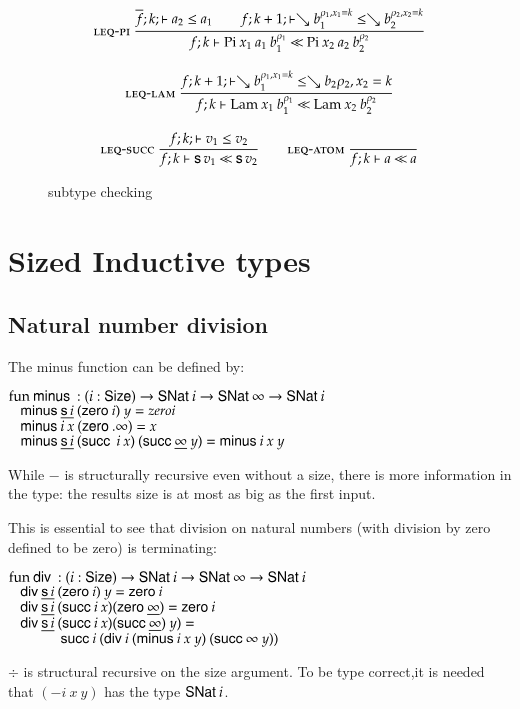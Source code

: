 \begin{figure}
\begin{gather*}
\mbox{\sc leq-pi}\ \dfrac{\overline{f};k;\vdash a_2\leq a_1
\qquad
f;k+1;\vdash\searrow b_1^{\rho_1,x_1=k}\leq\searrow b_2^{\rho_2,x_2=k}}{f;k\vdash\mathrm{Pi} \: x_1 \: a_1 \: b_1^{\rho_1}{\:\ll\:}\mathrm{Pi} \: x_2 \: a_2 \: b_2^{\rho_2}}
\\[2ex]
\mbox{\sc leq-lam}\ \dfrac{f;k+1;\vdash\searrow b_1^{\rho_1,x_1=k}\leq\searrow{b_2}{\rho_2,x_2=k}}{f;k\vdash\mathrm{Lam} \: x_1 \: b_1^{\rho_1}{\:\ll\:}\mathrm{Lam} \: x_2 \: b_2^{\rho_2}}
\\[2ex]
\mbox{\sc leq-succ}\ \dfrac{f;k;\vdash v_1\leq v_2}{f;k\vdash\mathsf{s}\, v_1{\:\ll\:}\mathsf{s}\, v_2}
\qquad
\mbox{\sc leq-atom}\ \dfrac{}{f;k\vdash a{\:\ll\:}a}
\end{gather*}
\caption{subtype checking}
\end{figure}

\section{Sized Inductive types }

\subsection{Natural number division}

The minus function can be defined by:
\begin{bsp}
$\mathrm{fun}\: \mathsf{minus}\: : (i : \mathsf{Size} ) \rightarrow \mathsf{SNat}\: i \rightarrow \mathsf{SNat}\: \infty \rightarrow \mathsf{SNat}\: i$\\
$\hspace*{3mm} \mathsf{minus}\: \underline{\mathsf{s}\, i} \: (\mathsf{zero}\: i) \:  y = zero i $ \\
$\hspace*{3mm} \mathsf{minus}\: i \: x \: (\mathsf{zero}\: .\infty)  = x $\\
$\hspace*{3mm} \mathsf{minus}\: \underline{\mathsf{s}\, i} \: (\mathsf{succ}\: \: i \: x) \: (\mathsf{succ}\: \underline{\infty} \: y) = \mathsf{minus}\: i \: x \: y $
\end{bsp}
While $\minus$ is structurally recursive even without a size, 
there is more information in the type: the results size is at most as big as the first input.

This is essential to see that division on natural numbers (with division by zero defined to be zero) 
is terminating:
\begin{bsp}
$\mathrm{fun}\: \mathsf{div}\: : ( i : \mathsf{Size} )  \rightarrow  \mathsf{SNat}\: i \rightarrow \mathsf{SNat}\: \infty \rightarrow \mathsf{SNat}\: i$\\
$\hspace*{3mm} \mathsf{div}\: \underline{\mathsf{s}\, i} \: (\mathsf{zero}\: i) \: y = \mathsf{zero}\: i$\\
$\hspace*{3mm} \mathsf{div}\: \underline{\mathsf{s}\, i} \: (\mathsf{succ}\: i \: x) (\mathsf{zero}\: \underline{\infty})  = \mathsf{zero}\: i$\\
$\hspace*{3mm} \mathsf{div}\: \underline{\mathsf{s}\, i} \: (\mathsf{succ}\: i \: x) (\mathsf{succ}\: \underline{\infty}) \: y) = $\\
$\spc \spcx \suc i \: (\div i \: (\minus i \: x \:y) \: (\suc \infty \: y))$
\end{bsp}
$\div$ is structural recursive on the size argument.
To be type correct,it is needed that $(\minus i \: x \:y)$ has the type $\mathsf{SNat}\: i$.

